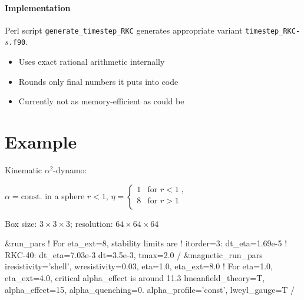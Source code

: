\documentclass[\mydriver,12pt,twoside,notitlepage]{article}
\newcommand{\BoxLabel}[1]{\fbox{\rmfamily\emph{#1}}}
\newcommand{\colEmph}[1]{{\color{DarkishBlue}#1}}
\begin{document}
\clearpage

%
\paragraph{Implementation}

Perl script \colEmph{\texttt{generate\_timestep\_RKC}} generates appropriate
variant  \colEmph{\texttt{timestep\_RKC-$s$.f90}}.

\begin{itemize}
\item Uses exact rational arithmetic internally
\item Rounds only final numbers it puts into code
\item Currently not as memory-efficient as could be
\end{itemize}


\section{Example}

Kinematic $\alpha^2$-dynamo:

$\alpha=\mathrm{const.}$ in a sphere $r<1$,
\qquad
$\eta = \begin{cases}
    1 & \text{for $r<1$} \; , \\
    8 & \text{for $r>1$}\\
  \end{cases}$

Box size: $3\times3\times3$;
resolution: $64\times64\times64$
\medskip

{\small\color{DarkBlue}
\begin{CodeVerbatim}[label=\BoxLabel{run.in}]
  &run_pars
    ! For eta_ext=8, stability limits are
    !   itorder=3:  dt_eta=1.69e-5
    !   RKC-40:     dt_eta=7.03e-3
    dt=3.5e-3, tmax=2.0
  /
  &magnetic_run_pars
    iresistivity='shell', wresistivity=0.03,
    eta=1.0, eta_ext=8.0
    ! For eta=1.0, eta_ext=4.0, critical alpha_effect is around 11.3
    lmeanfield_theory=T, alpha_effect=15, alpha_quenching=0.
    alpha_profile='const', lweyl_gauge=T
  /
\end{CodeVerbatim}
}



\end{document}
